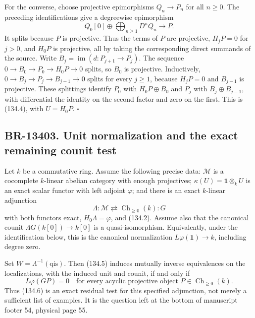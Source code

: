 \documentclass[11pt,a4paper]{article}
\theoremstyle{definition}\newtheorem{definition}[theorem]{Definition}
\theoremstyle{remark}\newtheorem{remark}[theorem]{Remark}
\begin{document}
For the converse, choose projective epimorphisms \(Q_n\to P_n\)
for all \(n\geq0\).  The preceding identifications give a degreewise
epimorphism
\[
 Q_0[0]\oplus\bigoplus_{n\geq1}D^nQ_n\longrightarrow P.
\]
It splits because \(P\) is projective.  Thus the terms of \(P\)
are projective, \(H_jP=0\) for \(j>0\), and \(H_0P\) is
projective, all by taking the corresponding direct summands of the
source.  Write \(B_j=\operatorname{im}(d:P_{j+1}\to P_j)\).
The sequence \(0\to B_0\to P_0\to H_0P\to0\) splits, so
\(B_0\) is projective.  Inductively,
\(0\to B_j\to P_j\to B_{j-1}\to0\) splits for every \(j\geq1\),
because \(H_jP=0\) and \(B_{j-1}\) is projective.  These splittings
identify \(P_0\) with \(H_0P\oplus B_0\) and \(P_j\) with
\(B_j\oplus B_{j-1}\), with differential the identity on the second
factor and zero on the first.  This is (134.4), with \(U=H_0P\).
\(\square\)

\subsection{BR-13403. Unit normalization and the exact remaining counit test}
Let \(k\) be a commutative ring.  Assume the following precise data:
\(\mathcal M\) is a cocomplete \(k\)-linear abelian category with
enough projectives; \(\kappa(U)=\mathbf1\otimes_k U\) is an exact
scalar functor with left adjoint \(\varphi\); and there is an exact
\(k\)-linear adjunction
\[
 \Lambda:\mathcal M\rightleftarrows
 \operatorname{Ch}_{\geq0}(k):G
 \tag{134.5}
\]
with both functors exact, \(H_0\Lambda=\varphi\), and (134.2).
Assume also that the canonical counit
\(\Lambda G(k[0])\to k[0]\) is a quasi-isomorphism.  Equivalently,
under the identification below, this is the canonical normalization
\(L\varphi(\mathbf1)\to k\), including degree zero.

Set \(W=\Lambda^{-1}(\mathrm{qis})\).  Then (134.5) induces
mutually inverse equivalences on the localizations, with the induced
unit and counit, if and only if
\[
 L\varphi(GP)=0
 \quad\text{for every acyclic projective object }
 P\in\operatorname{Ch}_{\geq0}(k).
 \tag{134.6}
\]
Thus (134.6) is an exact residual test for this specified adjunction,
not merely a sufficient list of examples.  It is the question left at
the bottom of manuscript footer 54, physical page 55.
\end{document}
